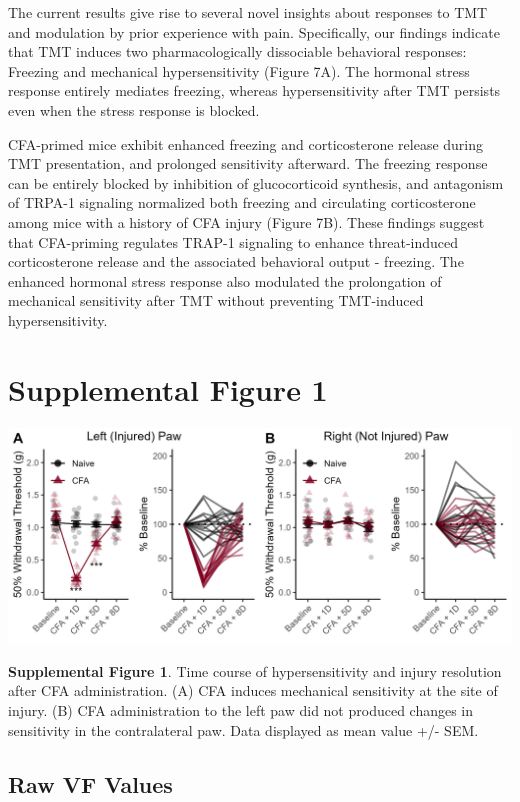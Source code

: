 \documentclass[
]{book}
\begin{document}
The current results give rise to several novel insights about responses to TMT and modulation by prior experience with pain. Specifically, our findings indicate that TMT induces two pharmacologically dissociable behavioral responses: Freezing and mechanical hypersensitivity (Figure 7A). The hormonal stress response entirely mediates freezing, whereas hypersensitivity after TMT persists even when the stress response is blocked.

CFA-primed mice exhibit enhanced freezing and corticosterone release during TMT presentation, and prolonged sensitivity afterward. The freezing response can be entirely blocked by inhibition of glucocorticoid synthesis, and antagonism of TRPA-1 signaling normalized both freezing and circulating corticosterone among mice with a history of CFA injury (Figure 7B). These findings suggest that CFA-priming regulates TRAP-1 signaling to enhance threat-induced corticosterone release and the associated behavioral output - freezing. The enhanced hormonal stress response also modulated the prolongation of mechanical sensitivity after TMT without preventing TMT-induced hypersensitivity.

\chapter*{Supplemental Figure 1}\label{supplemental-figure-1}

\includegraphics[width=29.17in]{Figs/S1_CFA_Recover}

\textbf{Supplemental Figure 1}. Time course of hypersensitivity and injury resolution after CFA administration. (A) CFA induces mechanical sensitivity at the site of injury. (B) CFA administration to the left paw did not produced changes in sensitivity in the contralateral paw. Data displayed as mean value +/- SEM.

\section*{Raw VF Values}\label{raw-vf-values}
\end{document}
